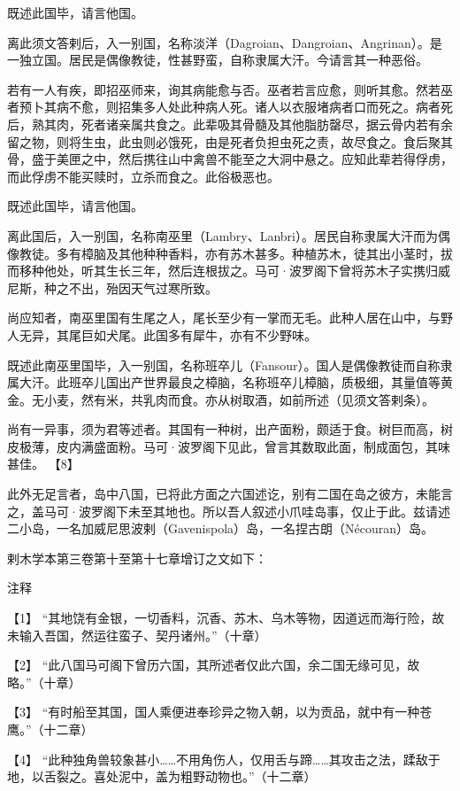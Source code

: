 \documentclass[12pt,UTF8]{ctexbook}
\begin{document}
既述此国毕，请言他国。

离此须文答剌后，入一别国，名称淡洋（Dagroian、Dangroian、Angrinan）。是一独立国。居民是偶像教徒，性甚野蛮，自称隶属大汗。今请言其一种恶俗。

若有一人有疾，即招巫师来，询其病能愈与否。巫者若言应愈，则听其愈。然若巫者预卜其病不愈，则招集多人处此种病人死。诸人以衣服堵病者口而死之。病者死后，熟其肉，死者诸亲属共食之。此辈吸其骨髓及其他脂肪罄尽，据云骨内若有余留之物，则将生虫，此虫则必饿死，由是死者负担虫死之责，故尽食之。食后聚其骨，盛于美匣之中，然后携往山中禽兽不能至之大洞中悬之。应知此辈若得俘虏，而此俘虏不能买赎时，立杀而食之。此俗极恶也。

既述此国毕，请言他国。

离此国后，入一别国，名称南巫里（Lambry、Lanbri）。居民自称隶属大汗而为偶像教徒。多有樟脑及其他种种香料，亦有苏木甚多。种植苏木，徒其出小茎时，拔而移种他处，听其生长三年，然后连根拔之。马可·波罗阁下曾将苏木子实携归威尼斯，种之不出，殆因天气过寒所致。

尚应知者，南巫里国有生尾之人，尾长至少有一掌而无毛。此种人居在山中，与野人无异，其尾巨如犬尾。此国多有犀牛，亦有不少野味。

既述此南巫里国毕，入一别国，名称班卒儿（Fansour）。国人是偶像教徒而自称隶属大汗。此班卒儿国出产世界最良之樟脑，名称班卒儿樟脑，质极细，其量值等黄金。无小麦，然有米，共乳肉而食。亦从树取酒，如前所述（见须文答剌条）。

尚有一异事，须为君等述者。其国有一种树，出产面粉，颇适于食。树巨而高，树皮极薄，皮内满盛面粉。马可·波罗阁下见此，曾言其数取此面，制成面包，其味甚佳。 【8】

此外无足言者，岛中八国，已将此方面之六国述讫，别有二国在岛之彼方，未能言之，盖马可·波罗阁下未至其地也。所以吾人叙述小爪哇岛事，仅止于此。兹请述二小岛，一名加威尼思波剌（Gavenispola）岛，一名捏古朗（Nécouran）岛。

剌木学本第三卷第十至第十七章增订之文如下：

注释

【1】 “其地饶有金银，一切香料，沉香、苏木、乌木等物，因道远而海行险，故未输入吾国，然运往蛮子、契丹诸州。”（十章）

【2】 “此八国马可阁下曾历六国，其所述者仅此六国，余二国无缘可见，故略。”（十章）

【3】 “有时船至其国，国人乘便进奉珍异之物入朝，以为贡品，就中有一种苍鹰。”（十二章）

【4】 “此种独角兽较象甚小……不用角伤人，仅用舌与蹄……其攻击之法，蹂敌于地，以舌裂之。喜处泥中，盖为粗野动物也。”（十二章）
\end{document}
